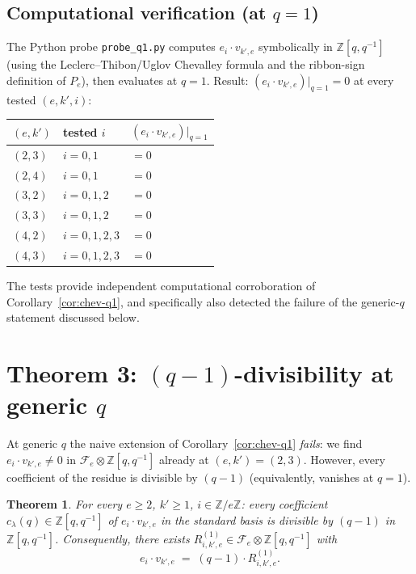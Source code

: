 \documentclass[11pt]{article}
\newtheorem{theorem}{Theorem}
\theoremstyle{definition}
\newcommand{\Fock}{\mathcal{F}}
\newcommand{\vke}{v_{k',e}}
\begin{document}
\subsection*{Computational verification (at $q=1$)}

The Python probe \texttt{probe\_q1.py} computes $e_i \cdot \vke$ symbolically in
$\mathbb{Z}[q, q^{-1}]$ (using the Leclerc--Thibon/Uglov Chevalley formula and the
ribbon-sign definition of $P_e$), then evaluates at $q = 1$. Result:
$(e_i \cdot \vke)|_{q=1} = 0$ at every tested $(e, k', i)$:
\begin{center}
\begin{tabular}{lll}
    \toprule
    $(e, k')$ & tested $i$ & $(e_i \cdot \vke)|_{q=1}$ \\
    \midrule
    $(2, 3)$ & $i = 0, 1$ & $= 0$ \\
    $(2, 4)$ & $i = 0, 1$ & $= 0$ \\
    $(3, 2)$ & $i = 0, 1, 2$ & $= 0$ \\
    $(3, 3)$ & $i = 0, 1, 2$ & $= 0$ \\
    $(4, 2)$ & $i = 0, 1, 2, 3$ & $= 0$ \\
    $(4, 3)$ & $i = 0, 1, 2, 3$ & $= 0$ \\
    \bottomrule
\end{tabular}
\end{center}
The tests provide independent computational corroboration of
Corollary~\ref{cor:chev-q1}, and specifically also detected the failure of the
generic-$q$ statement discussed below.

\section{Theorem 3: $(q-1)$-divisibility at generic $q$}

At generic $q$ the naive extension of Corollary~\ref{cor:chev-q1} \emph{fails}:
we find $e_i \cdot \vke \neq 0$ in $\Fock_e \otimes \mathbb{Z}[q, q^{-1}]$ already
at $(e, k') = (2, 3)$. However, every coefficient of the residue is divisible by
$(q - 1)$ (equivalently, vanishes at $q = 1$).

\begin{theorem} \label{thm:qminus1-div}
For every $e \ge 2$, $k' \ge 1$, $i \in \mathbb{Z}/e\mathbb{Z}$: every coefficient
$c_\lambda(q) \in \mathbb{Z}[q, q^{-1}]$ of $e_i \cdot \vke$ in the standard basis
is divisible by $(q - 1)$ in $\mathbb{Z}[q, q^{-1}]$. Consequently, there exists
$R_{i,k',e}^{(1)} \in \Fock_e \otimes \mathbb{Z}[q, q^{-1}]$ with
\[
    e_i \cdot \vke \;=\; (q - 1) \cdot R_{i,k',e}^{(1)}.
\]
\end{theorem}
\end{document}
